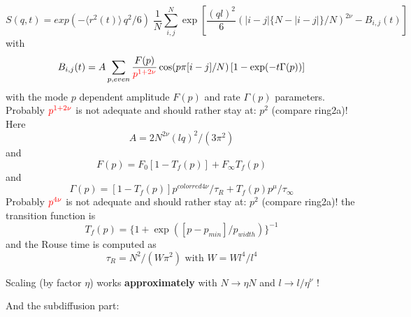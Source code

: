 \documentclass[11pt,fleqn]{book} %
\begin{document}
\begin{exercise}
\begin{equation}
\label{eq:ring}
S(q,t) = exp\left (-\langle r^2(t) \rangle \, q^2/6 \right) \;
 \frac{1}{N} \sum_{i,j}^N \exp \left [ 
\frac{(ql)^2}{6} \left ( |i-j| \{ N-|i-j|\}/N \right )^{2 \nu}
- B_{i,j}(t)
\right ]
\end{equation}
with
\begin{equation}
B_{i,j}(t) = A\sum_{p,even} \frac{F(p)}{\color{red}p^{1+2\nu}} \cos(p \pi [i-j]/N) \, [1-\exp(-t \Gamma(p))]
\end{equation}
with the mode ${p}$ dependent amplitude ${F(p)}$ and rate ${\Gamma (p)}$ parameters.
Probably ${\color{red}p^{1+2\nu}}$ is not adequate and should rather stay at: ${p^2}$ (compare ring2a)!
Here
\begin{equation}
A = 2 N^{2\nu}(l q)^2/(3 \pi^2)
\end{equation}
and
\begin{equation}
F(p)=F_0 [1-T_f(p)] + F_\infty T_f(p)
\end{equation}
and
\begin{equation}
\Gamma(p) = [1-T_f(p)] p^{color{red}4 \nu}/\tau_R + T_f(p)p^{\mu}/\tau_\infty
\end{equation}
Probably ${\color{red}p^{4\nu}}$ is not adequate and should rather stay at: ${p^2}$ (compare ring2a)!
the transition function is
\begin{equation}
T_f(p) = \{1+\exp([p-p_{min}]/p_{width})\}^{-1}
\end{equation}
and the
Rouse time is computed as 
\begin{equation}
\tau_R = N^2/(W \pi^2) \text{   with   } W = Wl^4 / l^4
\end{equation}

Scaling (by factor ${\eta}$) works 
{\bf approximately} with ${N \rightarrow \eta N}$  and ${l \rightarrow l/\eta^\nu}$  !

\end{exercise}

And the subdiffusion part:
\end{document}
